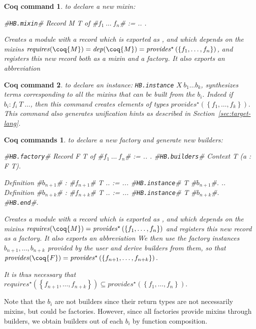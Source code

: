 \documentclass[a4paper,UKenglish,cleveref, autoref]{lipics-v2019}
\newcommand{\mixin}{mixin}
\newcommand{\mixins}{mixins}
\newcommand{\factory}{factory}
\newcommand{\factories}{factories}
\newcommand{\phantterm}{abbreviation}
\newcommand{\mixinbuilders}{builders}
\newcommand{\factoryinstances}{factory instances}
\newcommand{\dep}{\ensuremath{\mathit{dep}}}
\newcommand{\requires}{\ensuremath{\mathit{requires}}}
\newcommand{\provides}{\ensuremath{\mathit{provides}}}
\newcommand{\set}[1]{\left\{#1\right\}}
\newcommand{\enum}[2]{\ensuremath{\set{#1,\ldots,#2}}}
\newcommand{\hbmixin}{{\tt\color{dkgreen}HB.mixin}}
\newcommand{\hbfactory}{{\tt\color{dkgreen}HB.factory}}
\newcommand{\hbinstance}{{\tt\color{dkgreen}HB.instance}}
\newcommand{\hbbuilders}{{\tt\color{dkgreen}HB.builders}}
\newcommand{\hbend}{{\tt\color{dkgreen}HB.end}}
\theoremstyle{implem}
\theoremstyle{implem}
\theoremstyle{command}
\newtheorem*{command}{Coq command}
\theoremstyle{commands}
\newtheorem*{commands}{Coq commands}
\begin{document}
\begin{command} to declare a new mixin:
\begin{coqcode}
#\hbmixin{}# Record M T of #$f_1\ \ldots\ f_n$# := { .. }.
\end{coqcode}
  Creates a module  with a record which is exported as
  , and which depends on the \mixins{}
  \(\requires{}(\coq{M}) = \dep{}(\coq{M}) =
  \provides{}^\star\left(\enum{f_1}{f_n}\right)\), and registers this
  new record both as a \mixin{} and a \factory{}. It also exports an
  \phantterm{} 
\end{command}

\begin{command} to declare an instance: \hbinstance{}
  \(X\ b_1 \ldots b_k\), synthesizes terms corresponding to all the
  \mixins{} that can be built from the $b_i$. Indeed if
  \(b_i : f_i\ T\ \ldots\), then this command creates elements of types
  \(\provides{}^\star\left(\enum{f_1}{f_k}\right).\) This command also
  generates unification hints as described in
  Section~\ref{sec:target-lang}.
\end{command}

\begin{commands} to declare a new \factory{} and generate new \mixinbuilders:
\begin{coqcode}
#\hbfactory{}# Record F T of #$f_1\ \ldots\ f_n$# := { .. }.
#\hbbuilders{}# Context T (a : F T).

  Definition #$b_{n+1}$# : #$f_{n+1}$# T .. := ...
  #\hbinstance{}# T #$b_{n+1}$#.
  ..
  Definition #$b_{n+k}$# : #$f_{n+k}$# T .. := ...
  #\hbinstance{}# T #$b_{n+k}$#.
#\hbend{}#.
\end{coqcode}
  Creates a module  with a record which is exported as
  , and which depends on the mixins
  \(\requires{}(\coq{M}) =
  \provides{}^\star\left(\enum{f_1}{f_n}\right)\) and registers this
  new record as a factory.  It also exports an
  \phantterm{}  We then use the \factoryinstances{}
  \(b_{n+1}, \ldots, b_{n+k}\) provided by the user and derive
  \mixinbuilders{} from them, so that
  \(\provides{}(\coq{F}) = \provides{}^\star\left(\enum{f_{n+1}}{f_{n+k}}\right).\)

  It is thus necessary that
  \(\requires{}^\star\left(\enum{f_{n+1}}{f_{n+k}}\right) \subseteq
  \provides{}^\star\left(\enum{f_1}{f_n}\right).\)
\end{commands}

Note that the \(b_i\) are not \mixinbuilders{} since their return types
are not necessarily \mixins{}, but could be \factories{}. However, since all
\factories{} provide \mixins{} through \mixinbuilders{}, we
obtain \mixinbuilders{} out of each \(b_i\) by function composition.
\end{document}
